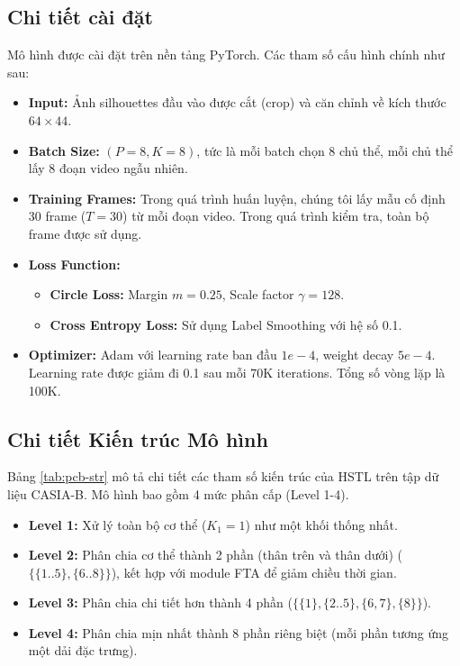 \subsection{Chi tiết cài đặt}
Mô hình được cài đặt trên nền tảng PyTorch. Các tham số cấu hình chính như sau:
\begin{itemize}
    \item \textbf{Input:} Ảnh silhouettes đầu vào được cắt (crop) và căn chỉnh về kích thước $64 \times 44$.
    \item \textbf{Batch Size:} $(P=8, K=8)$, tức là mỗi batch chọn 8 chủ thể, mỗi chủ thể lấy 8 đoạn video ngẫu nhiên.
    \item \textbf{Training Frames:} Trong quá trình huấn luyện, chúng tôi lấy mẫu cố định 30 frame ($T=30$) từ mỗi đoạn video. Trong quá trình kiểm tra, toàn bộ frame được sử dụng.
    \item \textbf{Loss Function:}
          \begin{itemize}
              \item \textbf{Circle Loss:} Margin $m=0.25$, Scale factor $\gamma=128$.
              \item \textbf{Cross Entropy Loss:} Sử dụng Label Smoothing với hệ số 0.1.
          \end{itemize}
    \item \textbf{Optimizer:} Adam với learning rate ban đầu $1e-4$, weight decay $5e-4$. Learning rate được giảm đi 0.1 sau mỗi 70K iterations. Tổng số vòng lặp là 100K.
\end{itemize}

\subsection{Chi tiết Kiến trúc Mô hình}
Bảng \ref{tab:pcb-str} mô tả chi tiết các tham số kiến trúc của HSTL trên tập dữ liệu CASIA-B. Mô hình bao gồm 4 mức phân cấp (Level 1-4).
\begin{itemize}
    \item \textbf{Level 1:} Xử lý toàn bộ cơ thể ($K_1=1$) như một khối thống nhất.
    \item \textbf{Level 2:} Phân chia cơ thể thành 2 phần (thân trên và thân dưới) ($\{\{1..5\}, \{6..8\}\}$), kết hợp với module FTA để giảm chiều thời gian.
    \item \textbf{Level 3:} Phân chia chi tiết hơn thành 4 phần ($\{\{1\}, \{2..5\}, \{6,7\}, \{8\}\}$).
    \item \textbf{Level 4:} Phân chia mịn nhất thành 8 phần riêng biệt (mỗi phần tương ứng một dải đặc trưng).
\end{itemize}


